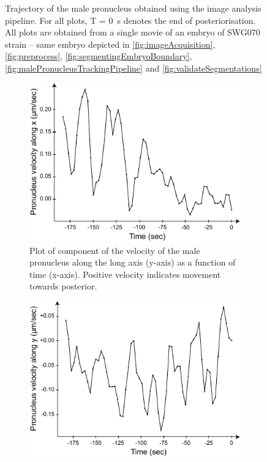 \begin{figure}[h]
\caption[Image analysis: Trajectory of male pronucleus]{Trajectory of the male pronucleus obtained using the image analysis pipeline. For all plots, T = \SI{0}{\second} denotes the end of posteriorisation. All plots are obtained from a single movie of an embryo of SWG070 strain -- same embryo depicted in \autoref{fig:imageAcquisition}, \autoref{fig:preprocess}, \autoref{fig:segmentingEmbryoBoundary}, \autoref{fig:malePronucleusTrackingPipeline} and \autoref{fig:validateSegmentations}}
\label{fig:malePronucleusTrackingResults}
\end{figure}

\begin{figure}[h]
\centering

\begin{subfigure}[t]{0.45\textwidth}
    \centering
    \includegraphics[width=\textwidth]{ExpMethods/FigTrackNucleus/vxVsTime.pdf}
    \caption{Plot of component of the velocity of the male pronucleus along the long axis (y-axis) as a function of time (x-axis). Positive velocity indicates movement towards posterior.} 
    \label{subfig:malePronucleusTrackingVelocities-vxVsTime}
\end{subfigure}
\hfill
\begin{subfigure}[t]{0.45\textwidth}
    \centering
    \includegraphics[width=\textwidth]{ExpMethods/FigTrackNucleus/vyVsTime.pdf}

\end{subfigure}
\end{figure}
